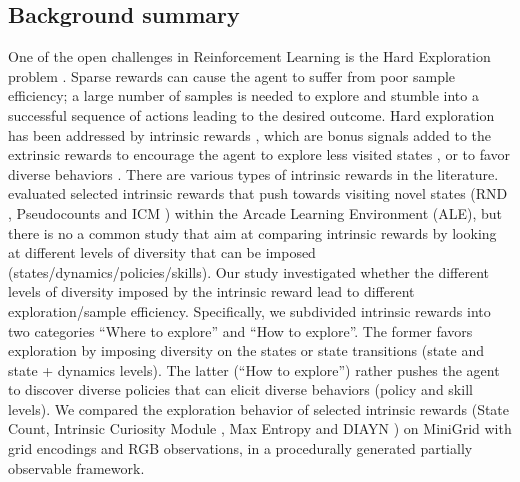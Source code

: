 \documentclass{article}
\begin{document}
\subsection{Background summary}
\label{section1}
One of the open challenges in Reinforcement Learning is the Hard Exploration problem \cite{sutton2018reinforcement}. Sparse rewards can cause the agent to suffer from poor sample efficiency; a large number of samples is needed to explore and stumble into a successful sequence
of actions leading to the desired outcome. Hard exploration has been addressed by intrinsic rewards \cite{chentanez2004intrinsically}, which are bonus signals added to the extrinsic rewards to encourage the agent to explore less visited states \cite{bellemare2016unifying,tang2017exploration,pathak2017curiosity,hazan2019provably,burda2018exploration, badia2020never}, or to favor diverse behaviors \cite{eysenbach2018diversity,zahavy2022discovering,eysenbach2021maximum,gregor2016variational}.
There are various types of intrinsic rewards in the literature. \cite{taiga2021bonus} evaluated selected intrinsic rewards that push towards visiting novel states (RND \cite{burda2018exploration}, Pseudocounts \cite{bellemare2016unifying} and ICM \cite{pathak2017curiosity}) 
within the Arcade Learning Environment (ALE), but there is no a common study that aim at comparing intrinsic rewards by looking at different levels of diversity that can be imposed (states/dynamics/policies/skills). 
Our study investigated whether the different levels of diversity imposed by the intrinsic reward lead to different exploration/sample efficiency. Specifically, we subdivided intrinsic rewards into two categories ``Where to explore'' and ``How to explore''. The former favors exploration by imposing diversity on the states or state transitions (state and state + dynamics levels). The latter (``How to explore'') rather pushes the agent to discover diverse policies that can elicit diverse behaviors (policy and skill levels). We compared the exploration behavior of selected intrinsic rewards (State Count, Intrinsic Curiosity Module \cite{pathak2017curiosity}, Max Entropy \cite{eysenbach2021maximum} and DIAYN \cite{eysenbach2018diversity}) on MiniGrid with grid encodings and RGB observations, in a procedurally generated partially observable framework.  
\end{document}
